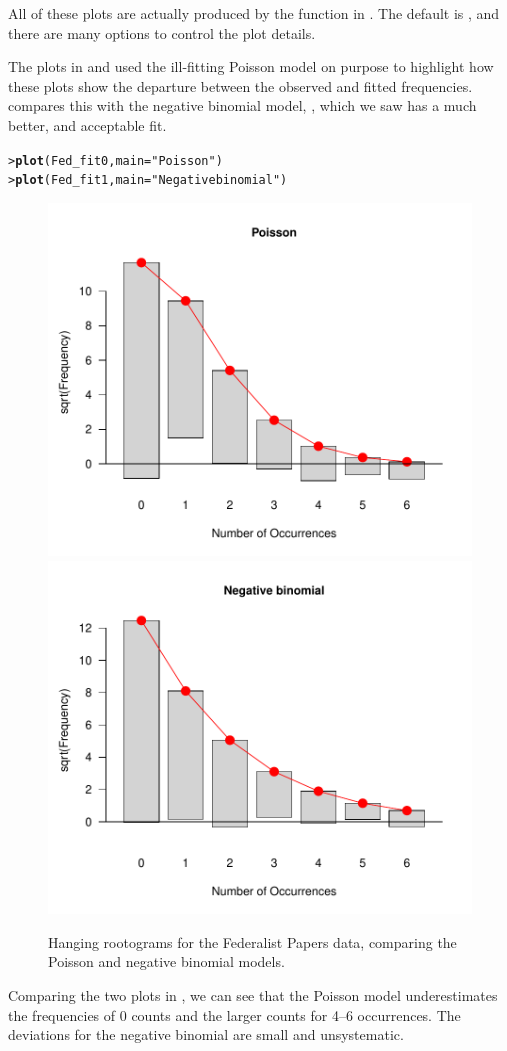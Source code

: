 \documentclass[10pt,krantz2]{krantz}\usepackage[]{graphicx}\usepackage[]{color}
\makeatletter
\newcommand{\hlstr}[1]{\textcolor[rgb]{0.192,0.494,0.8}{#1}}%
\newcommand{\hlstd}[1]{\textcolor[rgb]{0.345,0.345,0.345}{#1}}%
\newcommand{\hlkwc}[1]{\textcolor[rgb]{0.333,0.667,0.333}{#1}}%
\newcommand{\hlkwd}[1]{\textcolor[rgb]{0.737,0.353,0.396}{\textbf{#1}}}%
\newenvironment{kframe}{%
 \def\at@end@of@kframe{}%
 \ifinner\ifhmode%
  \def\at@end@of@kframe{\end{minipage}}%
  \begin{minipage}{\columnwidth}%
 \fi\fi%
 \def\FrameCommand##1{\hskip\@totalleftmargin \hskip-\fboxsep
 \colorbox{shadecolor}{##1}\hskip-\fboxsep
     \hskip-\linewidth \hskip-\@totalleftmargin \hskip\columnwidth}%
 \MakeFramed {\advance\hsize-\width
   \@totalleftmargin\z@ \linewidth\hsize
   \@setminipage}}%
 {\par\unskip\endMakeFramed%
 \at@end@of@kframe}
\newenvironment{knitrout}{}{} %
\renewenvironment{knitrout}{\small\renewcommand{\baselinestretch}{.85}}{} %
\makeatother
\begin{document}
All of these plots are actually produced by the  function
in .  The default is , and there are many
options to control the plot details.

The plots in  and 
used the ill-fitting Poisson model on purpose to highlight how these
plots show the departure between the observed and fitted frequencies.
 compares this with the negative
binomial model, , which we saw has a much better, and acceptable
fit.
\begin{knitrout}
\color{fgcolor}\begin{kframe}
\begin{alltt}
\hlstd{> }\hlkwd{plot}\hlstd{(Fed_fit0,} \hlkwc{main} \hlstd{=} \hlstr{"Poisson"}\hlstd{)}
\hlstd{> }\hlkwd{plot}\hlstd{(Fed_fit1,} \hlkwc{main} \hlstd{=} \hlstr{"Negative binomial"}\hlstd{)}
\end{alltt}
\end{kframe}\begin{figure}[!htbp]

\centerline{\includegraphics[width=.48\textwidth]{ch03/fig/Fed0-Fed1-1} 
\includegraphics[width=.48\textwidth]{ch03/fig/Fed0-Fed1-2} }

\caption[Hanging rootograms for the Federalist Papers data, comparing the Poisson and negative binomial models]{Hanging rootograms for the Federalist Papers data, comparing the Poisson and negative binomial models.\label{fig:Fed0-Fed1}}
\end{figure}


\end{knitrout}
Comparing the two plots in , we can see that the Poisson model underestimates the frequencies of 0 counts and the larger counts for 4--6 occurrences.
The deviations for the negative binomial are small and unsystematic.
\end{document}
